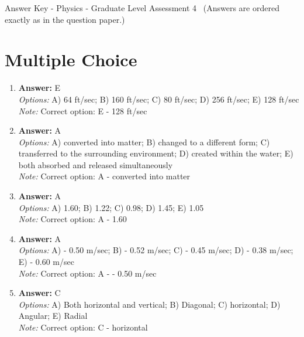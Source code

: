 \documentclass[12pt]{article}
\begin{document}
\begin{center}
Answer Key - Physics - Graduate Level Assessment 4 \
\small (Answers are ordered exactly as in the question paper.)
\end{center}

\section*{Multiple Choice}
\begin{enumerate}[label=\arabic*.]
\item \textbf{Answer:} E
\\ \textit{Options:} A) 64 ft/sec; B) 160 ft/sec; C) 80 ft/sec; D) 256 ft/sec; E) 128 ft/sec
\\ \textit{Note:} Correct option: E - 128 ft/sec
\item \textbf{Answer:} A
\\ \textit{Options:} A) converted into matter; B) changed to a different form; C) transferred to the surrounding environment; D) created within the water; E) both absorbed and released simultaneously
\\ \textit{Note:} Correct option: A - converted into matter
\item \textbf{Answer:} A
\\ \textit{Options:} A) 1.60; B) 1.22; C) 0.98; D) 1.45; E) 1.05
\\ \textit{Note:} Correct option: A - 1.60
\item \textbf{Answer:} A
\\ \textit{Options:} A) - 0.50 m/sec; B) - 0.52 m/sec; C) - 0.45 m/sec; D) - 0.38 m/sec; E) - 0.60 m/sec
\\ \textit{Note:} Correct option: A - - 0.50 m/sec
\item \textbf{Answer:} C
\\ \textit{Options:} A) Both horizontal and vertical; B) Diagonal; C) horizontal; D) Angular; E) Radial
\\ \textit{Note:} Correct option: C - horizontal
\end{enumerate}
\end{document}
